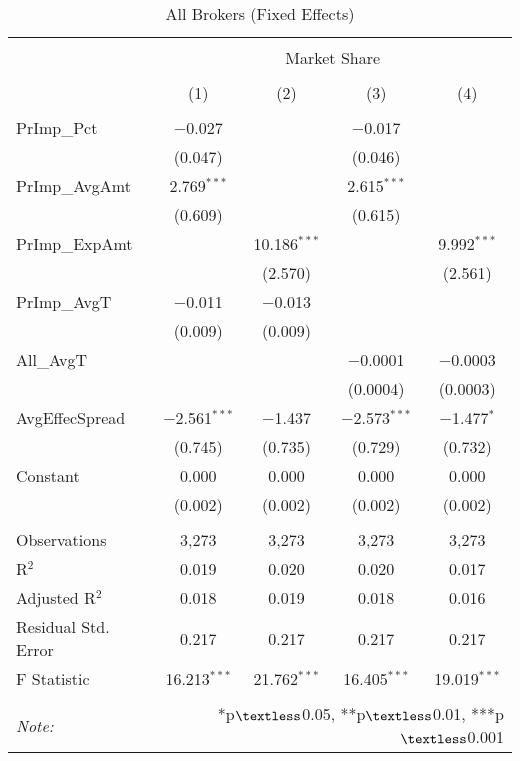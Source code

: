 \documentclass[12pt,a4paper]{article}
\begin{document}
		\begin{table}[!htbp] 
			\centering 
			\captionsetup{font=large}
			\caption{All Brokers (Fixed Effects)} 
			\label{} 
			\begin{tabular}{@{\extracolsep{1em}}lcccc} 
				\\[-1.8ex]\hline 
				\hline \\[-1.8ex] 
				& \multicolumn{4}{c}{Market Share} \\ 
				\cline{2-5} 
				\\[-1.8ex] & (1) & (2) & (3) & (4)\\ 
				\hline \\[-1.8ex] 
				PrImp\_Pct & $-$0.027 &  & $-$0.017 &  \\ 
				& (0.047) &  & (0.046) &  \\ 
				PrImp\_AvgAmt & 2.769$^{***}$ &  & 2.615$^{***}$ &  \\ 
				& (0.609) &  & (0.615) &  \\ 
				PrImp\_ExpAmt &  & 10.186$^{***}$ &  & 9.992$^{***}$ \\ 
				&  & (2.570) &  & (2.561) \\ 
				PrImp\_AvgT & $-$0.011 & $-$0.013 &  &  \\ 
				& (0.009) & (0.009) &  &  \\ 
				All\_AvgT &  &  & $-$0.0001 & $-$0.0003 \\ 
				&  &  & (0.0004) & (0.0003) \\ 
				AvgEffecSpread & $-$2.561$^{***}$ & $-$1.437 & $-$2.573$^{***}$ & $-$1.477$^{*}$ \\ 
				& (0.745) & (0.735) & (0.729) & (0.732) \\ 
				Constant & 0.000 & 0.000 & 0.000 & 0.000 \\ 
				& (0.002) & (0.002) & (0.002) & (0.002) \\ 
				\hline \\[-1.8ex] 
				Observations & 3,273 & 3,273 & 3,273 & 3,273 \\ 
				R$^{2}$ & 0.019 & 0.020 & 0.020 & 0.017 \\ 
				Adjusted R$^{2}$ & 0.018 & 0.019 & 0.018 & 0.016 \\ 
				Residual Std. Error & 0.217  & 0.217  & 0.217& 0.217  \\ 
				F Statistic & 16.213$^{***}$  & 21.762$^{***}$  & 16.405$^{***}$  & 19.019$^{***}$ \\ 
				\hline 
				\hline \\[-1.8ex] 
				\textit{Note:}  & \multicolumn{4}{r}{*p$\textless$0.05, **p$\textless$0.01, ***p$\textless$0.001} \\ 
			\end{tabular} 
		\end{table} 
	
\end{document}
